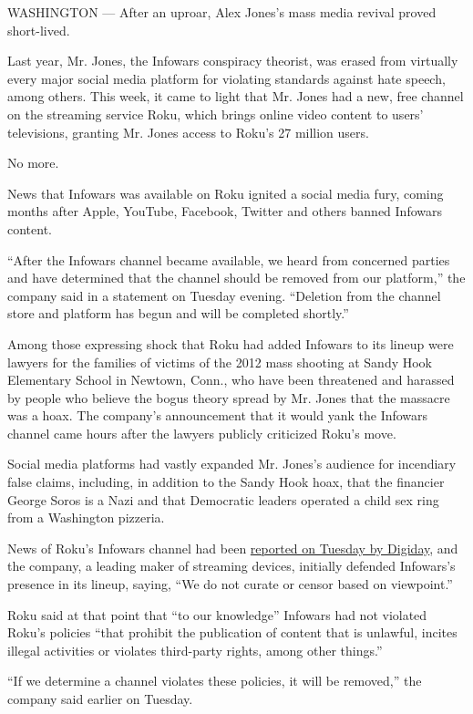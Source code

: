 WASHINGTON --- After an uproar, Alex Jones's mass media revival proved
short-lived.

Last year, Mr. Jones, the Infowars conspiracy theorist, was erased from
virtually every major social media platform for violating standards
against hate speech, among others. This week, it came to light that Mr.
Jones had a new, free channel on the streaming service Roku, which
brings online video content to users' televisions, granting Mr. Jones
access to Roku's 27 million users.

No more.

News that Infowars was available on Roku ignited a social media fury,
coming months after Apple, YouTube, Facebook, Twitter and others banned
Infowars content.

``After the Infowars channel became available, we heard from concerned
parties and have determined that the channel should be removed from our
platform,'' the company said in a statement on Tuesday evening.
``Deletion from the channel store and platform has begun and will be
completed shortly.''

Among those expressing shock that Roku had added Infowars to its lineup
were lawyers for the families of victims of the 2012 mass shooting at
Sandy Hook Elementary School in Newtown, Conn., who have been threatened
and harassed by people who believe the bogus theory spread by Mr. Jones
that the massacre was a hoax. The company's announcement that it would
yank the Infowars channel came hours after the lawyers publicly
criticized Roku's move.

Social media platforms had vastly expanded Mr. Jones's audience for
incendiary false claims, including, in addition to the Sandy Hook hoax,
that the financier George Soros is a Nazi and that Democratic leaders
operated a child sex ring from a Washington pizzeria.

News of Roku's Infowars channel had been
\href{https://digiday.com/media/roku-adds-infowars-channels-six-months-platforms-banned/}{reported
on Tuesday by Digiday}, and the company, a leading maker of streaming
devices, initially defended Infowars's presence in its lineup, saying,
``We do not curate or censor based on viewpoint.''

Roku said at that point that ``to our knowledge'' Infowars had not
violated Roku's policies ``that prohibit the publication of content that
is unlawful, incites illegal activities or violates third-party rights,
among other things.''

``If we determine a channel violates these policies, it will be
removed,'' the company said earlier on Tuesday.

